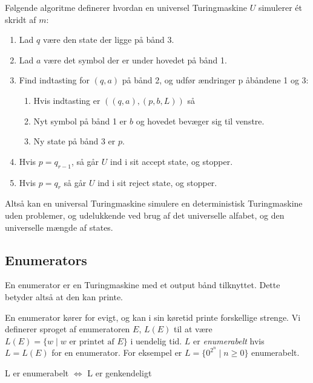 Følgende algoritme definerer hvordan en universel Turingmaskine $U$ simulerer ét skridt af $m$:
\begin{enumerate}
	\item Lad $q$ være den state der ligge på bånd 3.
	\item Lad $a$ være det symbol der er under hovedet på bånd 1.
	\item Find indtasting for $(q,a)$ på bånd 2, og udfør ændringer p åbåndene 1 og 3:
	      \begin{enumerate}
		      \item Hvis indtasting  er $((q,a),(p,b,L))$ så
		      \item Nyt symbol på bånd 1 er $b$ og hovedet bevæger sig til venstre.
		      \item Ny state på bånd 3 er $p$.
	      \end{enumerate}
	\item Hvis $p = q_{r-1}$, så går $U$ ind i sit accept state, og stopper.
	\item Hvis $p = q_{r}$ så går $U$ ind i sit reject state, og stopper.
\end{enumerate}

Altså kan en universal Turingmaskine simulere en deterministisk Turingmaskine uden problemer, og udelukkende ved brug af det universelle alfabet, og den universelle mængde af states.

\subsection{Enumerators}%
\label{subsec:enumerators}

En enumerator er en Turingmaskine med et output bånd tilknyttet. Dette betyder altså at den kan printe.

En enumerator kører for evigt, og kan i sin køretid printe forskellige strenge. Vi definerer sproget af enumeratoren $E$, $L(E)$ til at være $L(E) = \{w \mid w \text{ er printet af }E\}$ i uendelig tid. $L$ er \textit{enumerabelt}  hvis $L = L(E)$ for en enumerator. For eksempel er $L = \{0^{2^{n}} \mid n \ge 0\}$ enumerabelt.

\begin{theorem}
	L er enumerabelt  $\iff$ L er genkendeligt
\end{theorem}

